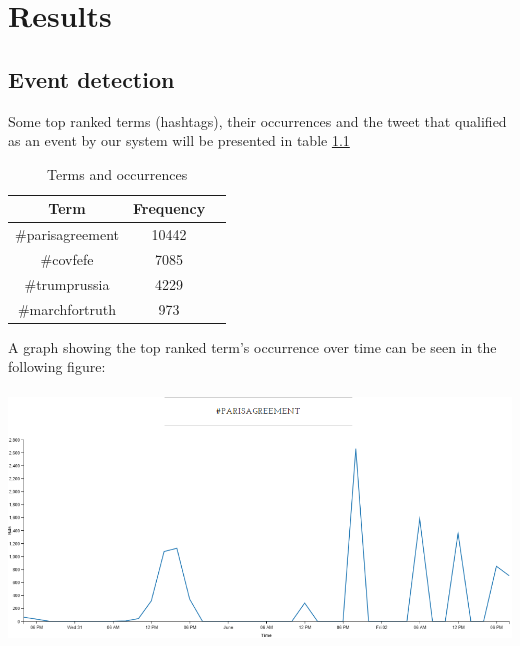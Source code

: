 \documentclass[12pt,svgnames]{report}
\begin{document}
\chapter{Results}
\section*{Event detection}
Some top ranked terms (hashtags), their occurrences and the tweet that qualified as an event by our system will be presented in table \ref{tab:tftags}

\begin{table}[h!]
	\centering

	\begin{tabular}{ccc}
		\toprule
		Term & Frequency\\
		\midrule
		\#parisagreement & 10442\\
		\#covfefe & 7085\\
		\#trumprussia & 4229\\
		\#marchfortruth & 973\\
		\bottomrule
	\end{tabular}
	\caption{Terms and occurrences}
\label{tab:tftags}
\end{table}


A graph showing the top ranked term's occurrence over time can be seen in the following figure:\\
\\
\includegraphics[scale=0.63]{hashparisplot.png}
\\
\end{document}
